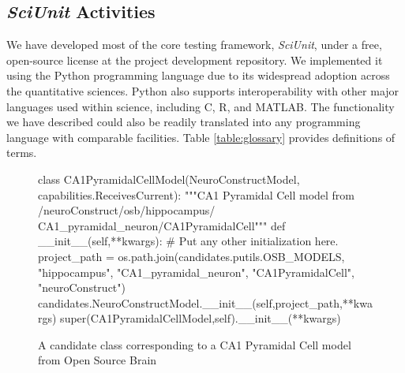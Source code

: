 \documentclass[11pt,letterpaper]{article}
\begin{document}
\subsection{\textit{SciUnit} Activities} We have developed most of the core testing framework, \textit{SciUnit}, under a free, open-source license at the project development repository\cite{sciunit_url}.  We implemented it using the Python programming language\cite{python} due to its widespread adoption across the quantitative sciences. Python also supports interoperability with other major languages used within science, including C, R\cite{r_url}, and MATLAB\cite{matlab_url}. The functionality we have described could also be readily translated into any programming language with comparable facilities.  Table \ref{table:glossary} provides definitions of terms.  

\begin{figure}
\begin{python}
class CA1PyramidalCellModel(NeuroConstructModel,
				            capabilities.ReceivesCurrent):
	"""CA1 Pyramidal Cell model from /neuroConstruct/osb/hippocampus/
	CA1_pyramidal_neuron/CA1PyramidalCell"""
	def __init__(self,**kwargs):
		# Put any other initialization here.
		project_path = os.path.join(candidates.putils.OSB_MODELS,
									"hippocampus",
									"CA1_pyramidal_neuron",
									"CA1PyramidalCell",
									"neuroConstruct")
		candidates.NeuroConstructModel.__init__(self,project_path,**kwargs)
		super(CA1PyramidalCellModel,self).__init__(**kwargs)
\end{python}
\caption{A candidate class corresponding to a CA1 Pyramidal Cell model from Open Source Brain}
\label{fig:ca1_model}
\end{figure}
\end{document}
